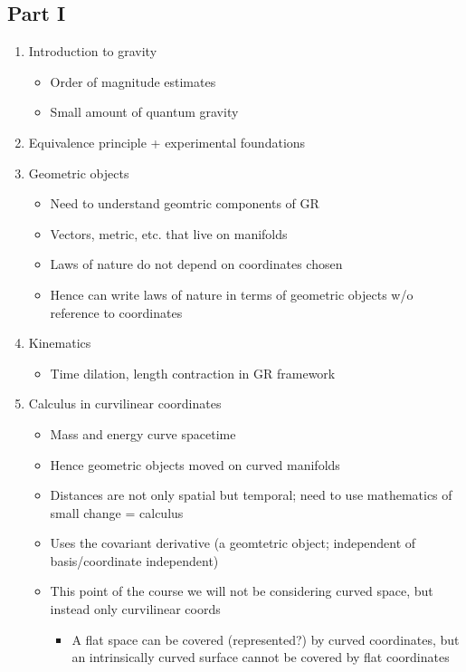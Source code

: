 \documentclass[a4paper]{article} %
\begin{document}
\subsection{Part I}
\begin{enumerate}
\item Introduction to gravity
\begin{itemize}
\item Order of magnitude estimates
\item Small amount of quantum gravity
\end{itemize}
\item Equivalence principle + experimental foundations
\item Geometric objects
\begin{itemize}
\item Need to understand geomtric components of GR
\item Vectors, metric, etc. that live on manifolds
\item Laws of nature do not depend on coordinates chosen
\item Hence can write laws of nature in terms of geometric objects w/o reference to coordinates
\end{itemize}
\item Kinematics
\begin{itemize}
\item Time dilation, length contraction in GR framework
\end{itemize}
\item Calculus in curvilinear coordinates
\begin{itemize}
\item Mass and energy curve spacetime
\item Hence geometric objects moved on curved manifolds
\item Distances are not only spatial but temporal; need to use mathematics of small change = calculus
\item Uses the covariant derivative (a geomtetric object; independent of basis/coordinate independent)
\item This point of the course we will not be considering curved space, but instead only curvilinear coords 
\begin{itemize}
\item A flat space can be covered (represented?) by curved coordinates, but an intrinsically curved surface cannot be covered by flat coordinates
\end{itemize}
\end{itemize}

\end{enumerate}
\end{document}
